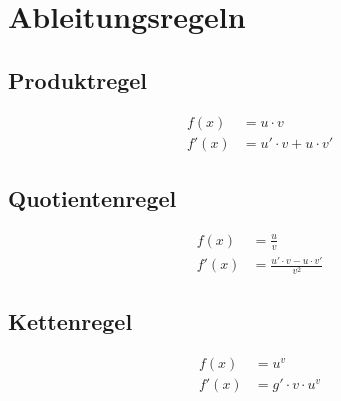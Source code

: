 \documentclass{article}
\begin{document}
\section{Ableitungsregeln}
\subsection{Produktregel}
\begin{align*} 
f(x) &= u \cdot v \\
f'(x) &= u' \cdot v + u \cdot v'
\end{align*} 
 
\subsection{Quotientenregel}
\begin{align*} 
f(x) &= \frac{u}{v} \\
f'(x) &= \frac{u' \cdot v - u \cdot v'}{v^2}
\end{align*}
 
\subsection{Kettenregel}
\begin{align*} 
f(x) &= u^v \\
f'(x) &= g' \cdot v \cdot u^v
\end{align*} 
 
\end{document}
